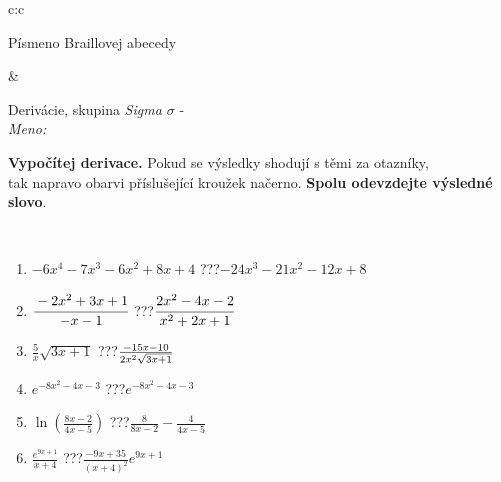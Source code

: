 \documentclass[10pt]{report}
\begin{document}
\begin{tabular}{c:c}
\begin{minipage}[c][104.5mm][t]{0.5\linewidth}
\begin{center}
\begin{minipage}{0.20\linewidth}
\begin{center}
{\small Písmeno Braillovej abecedy}
\end{center}
\end{minipage}
\end{center}
\end{minipage}
&
\begin{minipage}[c][104.5mm][t]{0.5\linewidth}
\begin{center}
\vspace{7mm}
{\huge Derivácie, skupina \textit{Sigma $\sigma$} -}\\[5mm]
\textit{Meno:}\phantom{xxxxxxxxxxxxxxxxxxxxxxxxxxxxxxxxxxxxxxxxxxxxxxxxxxxxxxxxxxxxxxxxx}\\[5mm]
\begin{minipage}{0.95\linewidth}
\begin{center}
\textbf{Vypočítej derivace.} Pokud se výsledky shodují s těmi za otazníky,\\tak napravo obarvi příslušející kroužek načerno. \textbf{Spolu odevzdejte výsledné slovo}.
\end{center}
\end{minipage}
\\[1mm]
\begin{minipage}{0.79\linewidth}
\begin{center}
\begin{varwidth}{\linewidth}
\begin{enumerate}
\normalsize
\item $-6x^4-7x^3-6x^2+8x+4$\quad \dotfill\; ???\;\dotfill \quad $-24x^3-21x^2-12x+8$
\item $\cfrac{-2x^2+3x+1}{-x-1}$\quad \dotfill\; ???\;\dotfill \quad $\cfrac{2x^2-4x-2}{x^2+2x+1}$
\item $\frac{5}{x}\sqrt{3x+1}$\quad \dotfill\; ???\;\dotfill \quad $\frac{-15x-10}{2x^2 \sqrt{\smash[b]{3x+1}}}$
\item $e^{-8x^2-4x-3}$\quad \dotfill\; ???\;\dotfill \quad $e^{-8x^2-4x-3}$
\item $\ln{\left(\frac{8x-2}{4x-5}\right)}$\quad \dotfill\; ???\;\dotfill \quad $\frac{8}{8x-2}-\frac{4}{4x-5}$
\item $\frac{e^{9x+1}}{x+4}$\quad \dotfill\; ???\;\dotfill \quad $\frac{-9x+35}{(x+4)^2}e^{9x+1}$
\end{enumerate}
\end{varwidth}
\end{center}
\end{minipage}
\begin{minipage}{0.20\linewidth}
\begin{center}

\end{center}
\end{minipage}
\end{center}
\end{minipage}
\end{tabular}
\end{document}
